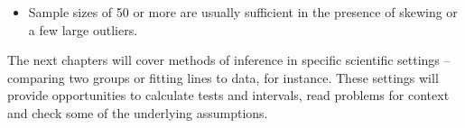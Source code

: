 \begin{spacing}{1.5}
\begin{itemize}
	\item Sample sizes of 50 or more are usually sufficient in the presence of skewing or a few large outliers.
		
\end{itemize}

The next chapters will cover methods of inference in specific scientific settings -- comparing two groups or fitting lines to data, for instance. These settings will provide opportunities to calculate tests and intervals, read problems for context and check some of the underlying assumptions.





\end{spacing}
 


